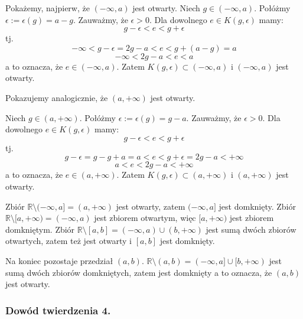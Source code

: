 \documentclass{article}
\begin{document}
Pokażemy, najpierw, że \((- \infty, a)\) jest otwarty. Niech \(g \in (- \infty, a)\). Połóżmy \(\epsilon := \epsilon(g) = a - g\).
Zauważmy, że \(\epsilon > 0\).
Dla dowolnego \(e \in K(g, \epsilon)\) mamy:
\begin{equation*}
    g - \epsilon < e < g + \epsilon
\end{equation*}
tj.
\begin{equation*}
    - \infty < g - \epsilon = 2g - a < e < g + (a - g) = a
\end{equation*}
\begin{equation*}
    - \infty < 2g - a < e < a 
\end{equation*}
a to oznacza, że \(e \in (- \infty, a)\). Zatem \(K(g, \epsilon) \subset (- \infty, a)\) i \((- \infty, a)\) jest otwarty.

Pokazujemy analogicznie, że \( (a, + \infty) \) jest otwarty. 

Niech \(g \in (a, + \infty) \). Połóżmy \(\epsilon := \epsilon(g) = g - a\).
Zauważmy, że \(\epsilon > 0\).
Dla dowolnego \(e \in K(g, \epsilon)\) mamy:
\begin{equation*}
    g - \epsilon < e < g + \epsilon
\end{equation*}
tj.
\begin{equation*}
    g - \epsilon = g - g + a = a < e < g + \epsilon = 2g - a < + \infty
\end{equation*}
\begin{equation*}
    a < e < 2g - a < + \infty
\end{equation*}
a to oznacza, że \(e \in (a, + \infty)\). Zatem \(K(g, \epsilon) \subset (a, + \infty)\) i \( (a, + \infty) \) jest otwarty.

Zbiór \(\mathbb{R} \setminus (- \infty, a] = (a, + \infty)\) jest otwarty, zatem \((- \infty, a]\) jest domknięty. Zbiór \(\mathbb{R} \setminus [a, + \infty) = (- \infty, a)\) 
jest zbiorem otwartym, więc \([a, + \infty)\) jest zbiorem domkniętym. Zbiór \(\mathbb{R} \setminus [a, b] = (- \infty, a) \cup (b, + \infty)\) jest sumą dwóch zbiorów otwartych, zatem
też jest otwarty i \([a, b]\) jest domknięty.

Na koniec pozostaje przedział \((a, b)\). \(\mathbb{R} \setminus (a, b) = (-\infty, a] \cup [b, + \infty)\) jest sumą dwóch zbiorów domkniętych, zatem jest domknięty a to oznacza, że
\((a, b)\) jest otwarty.


\subsubsection{Dowód twierdzenia 4.} 
\end{document}
